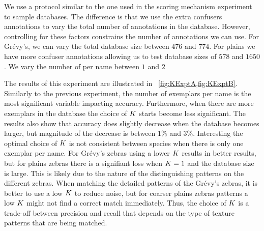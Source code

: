         We use a protocol similar to the one used in the scoring mechanism experiment to sample databases.
        The difference is that we use the extra confusers annotations to vary the total number of annotations in
          the database.
        However, controlling for these factors constrains the number of annotations we can use.
        For Grévy's, we can vary the total database size between $476$ and $774$.
        For plains we have more confuser annotations allowing us to test database sizes of $578$ and $1650$.
        We vary the number of \exemplars{} per name between $1$ and $2$

        The results of this experiment are illustrated in ~\cref{fig:KExptA,fig:KExptB}.
        Similarly to the previous experiment, the number of exemplars per name is the most significant variable
          impacting accuracy.
        Furthermore, when there are more exemplars in the database the choice of $K$ starts become less
          significant.
        The results also show that accuracy does slightly decrease when the database becomes larger, but
          magnitude of the decrease is between $1\percent$ and $3\percent$.
        Interesting the optimal choice of $K$ is not consistent between species when there is only one exemplar
          per name.
        For Grévy's zebras using a lower $K$ results in better results, but for plains zebras there is a
          signifiant loss when $K=1$ and the database size is large.
        This is likely due to the nature of the distinguishing patterns on the different zebras.
        When matching the detailed patterns of the Grévy's zebras, it is better to use a low $K$ to reduce
          noise, but for coarser plains zebras patterns a low $K$ might not find a correct match immediately.
        Thus, the choice of $K$ is a trade-off between precision and recall that depends on the type of texture
          patterns that are being matched.
        

